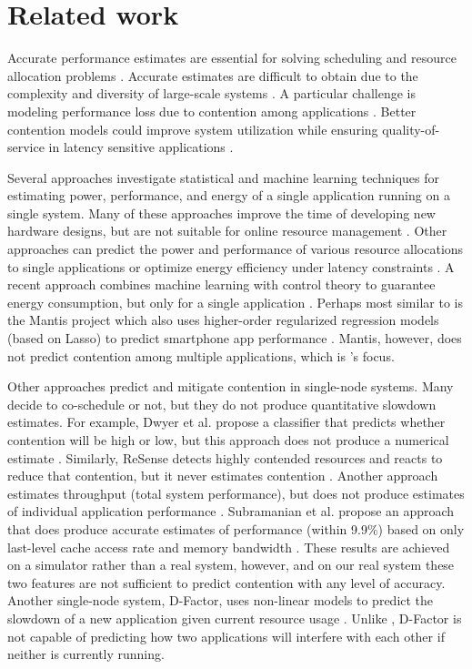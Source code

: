 \section{Related work}
Accurate performance estimates are essential for solving scheduling
and resource allocation problems \cite{chiang2002impact}.  Accurate
estimates are difficult to obtain due to the complexity and diversity
of large-scale systems \cite{kanev2015profiling}.  A particular
challenge is modeling performance loss due to contention among
applications \cite{kambadur2012measuring}.  Better contention models
could improve system utilization while ensuring quality-of-service in
latency sensitive applications \cite{Bubble-flux}.

Several approaches investigate statistical and machine learning
techniques for estimating power, performance, and energy of a single
application running on a single system.  Many of these approaches
improve the time of developing new hardware designs, but are not
suitable for online resource management
\cite{Yi2003,LeeBrooks2006,CPR}.  Other approaches can predict the
power and performance of various resource allocations to single
applications \cite{Koala} or optimize energy efficiency under latency
constraints \cite{LEO}.  A recent approach combines machine learning
with control theory to guarantee energy consumption, but only for a
single application \cite{JouleGuard}.  Perhaps most similar to
\SYSTEMESP{} is the Mantis project which also uses higher-order
regularized regression models (based on Lasso) to predict smartphone
app performance \cite{kwon2013mantis}.  Mantis, however, does not
predict contention among multiple applications, which is \SYSTEMESP{}'s
focus.

Other approaches predict and mitigate contention in single-node
systems.  Many decide to co-schedule or not, but they do not produce
quantitative slowdown estimates.  For example, Dwyer et al. propose a
classifier that predicts whether contention will be high or low, but
this approach does not produce a numerical estimate
\cite{dwyer2012practical}.  Similarly, ReSense detects highly
contended resources and reacts to reduce that contention, but it never
estimates contention \cite{resense}. Another approach estimates
throughput (total system performance), but does not produce estimates
of individual application performance
\cite{xu2010cache,chen2010performance}.  Subramanian et al. propose an
approach that does produce accurate estimates of performance (within
9.9\%) based on only last-level cache access rate and memory bandwidth
\cite{subramanian2015slowdown}.  These results are achieved on a
simulator rather than a real system, however, and on our real system
these two features are not sufficient to predict contention with any
level of accuracy.  Another single-node system, D-Factor, uses
non-linear models to predict the slowdown of a new application given
current resource usage \cite{Lim2012dfactor}.  Unlike \SYSTEMESP{},
D-Factor is not capable of predicting how two applications will
interfere with each other if neither is currently running.

